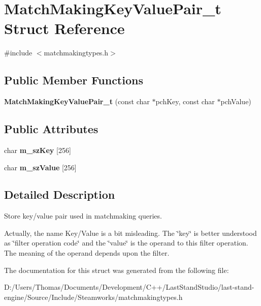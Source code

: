 \hypertarget{structMatchMakingKeyValuePair__t}{}\section{Match\+Making\+Key\+Value\+Pair\+\_\+t Struct Reference}
\label{structMatchMakingKeyValuePair__t}


{\ttfamily \#include $<$matchmakingtypes.\+h$>$}

\subsection*{Public Member Functions}
\begin{DoxyCompactItemize}
\item 
\hypertarget{structMatchMakingKeyValuePair__t_a8ce8c21742212fbea096ec042d579d44}{}{\bfseries Match\+Making\+Key\+Value\+Pair\+\_\+t} (const char $\ast$pch\+Key, const char $\ast$pch\+Value)\label{structMatchMakingKeyValuePair__t_a8ce8c21742212fbea096ec042d579d44}

\end{DoxyCompactItemize}
\subsection*{Public Attributes}
\begin{DoxyCompactItemize}
\item 
\hypertarget{structMatchMakingKeyValuePair__t_acd06bbb534e7a2b45832d2bf880e02d5}{}char {\bfseries m\+\_\+sz\+Key} \mbox{[}256\mbox{]}\label{structMatchMakingKeyValuePair__t_acd06bbb534e7a2b45832d2bf880e02d5}

\item 
\hypertarget{structMatchMakingKeyValuePair__t_ab6b45ed80df187fa469f8bc01f6286f9}{}char {\bfseries m\+\_\+sz\+Value} \mbox{[}256\mbox{]}\label{structMatchMakingKeyValuePair__t_ab6b45ed80df187fa469f8bc01f6286f9}

\end{DoxyCompactItemize}


\subsection{Detailed Description}
Store key/value pair used in matchmaking queries.

Actually, the name Key/\+Value is a bit misleading. The \char`\"{}key\char`\"{} is better understood as \char`\"{}filter operation code\char`\"{} and the \char`\"{}value\char`\"{} is the operand to this filter operation. The meaning of the operand depends upon the filter. 

The documentation for this struct was generated from the following file\+:\begin{DoxyCompactItemize}
\item 
D\+:/\+Users/\+Thomas/\+Documents/\+Development/\+C++/\+Last\+Stand\+Studio/last-\/stand-\/engine/\+Source/\+Include/\+Steamworks/matchmakingtypes.\+h\end{DoxyCompactItemize}
